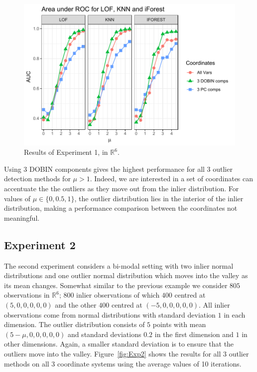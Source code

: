 \documentclass[11pt]{article}
\begin{document}
\begin{figure}[!t]
	\centering
	\includegraphics[scale=0.8]{Exp1.pdf}
	\caption{Results of Experiment 1, in $\mathbb{R}^6$.}
	\label{fig:Exp1}
\end{figure} 

Using $3$ DOBIN components gives the highest performance for all $3$ outlier detection methods for $\mu > 1$.  Indeed, we are interested in a set of coordinates can accentuate the the outliers as they move out from the inlier distribution.  For values of $\mu \in \{0, 0.5, 1\}$,  the outlier distribution lies in the interior of the inlier distribution, making a performance comparison between the coordinates not meaningful.   

\subsection{Experiment 2}
The second experiment considers a bi-modal setting with two inlier normal distributions and one outlier normal  distribution which moves into the valley as its mean changes. Somewhat similar to the previous example we consider $805$ observations in $\mathbb{R}^6$; $800$ inlier observations of which $400$  centred at $(5,0,0,0,0,0)$ and the other $400$ centred at $(-5,0,0,0,0,0)$. All inlier observations come from normal distributions with standard deviation $1$ in each dimension. The outlier distribution consists of $5$ points with mean $(5-\mu,0,0,0,0,0)$ and standard deviations $0.2$ in the first dimension and $1$ in other dimensions. Again, a smaller standard deviation is to ensure that the outliers move into the valley. Figure~\ref{fig:Exp2} shows the results for all $3$  outlier methods on all $3$ coordinate systems using the average values of 10 iterations. \\
\end{document}
